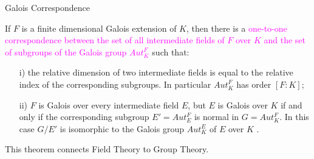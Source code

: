 \documentclass{beamer}
\begin{document}
\begin{frame}{Galois Correspondence}
    \begin{tcolorbox}[colback=white, colframe=blue!40, boxsep=1mm]
  \begin{theorem}
  If \(F\) is a finite dimensional Galois extension of \(K\), then there is a \textcolor{magenta}{one-to-one correspondence between the set of all intermediate fields of \(F\) over \(K\) and the set of subgroups of the Galois group \(Aut_K^F\)} such that:
  \begin{enumerate}
  \item[i)] the relative dimension of two intermediate fields is equal to the relative index of the corresponding subgroups. In particular \(Aut_K^F\) has order \([F:K]\);
  \item[ii)] \(F\) is Galois over every intermediate field \(E\), but \(E\) is Galois over \(K\) if and only if the corresponding subgroup \(E'= Aut_E^F\) is normal in \(G=Aut_K^F\). In this case \(G/E'\) is isomorphic to the Galois group \(Aut_K^E\) of \(E\) over \(K\) \cite{hunger}.
  \end{enumerate}
\end{theorem}
\end{tcolorbox}
\vspace{2mm}
\textcolor{green!40!black}{This theorem connects Field Theory to Group Theory.}
\end{frame}
\end{document}
